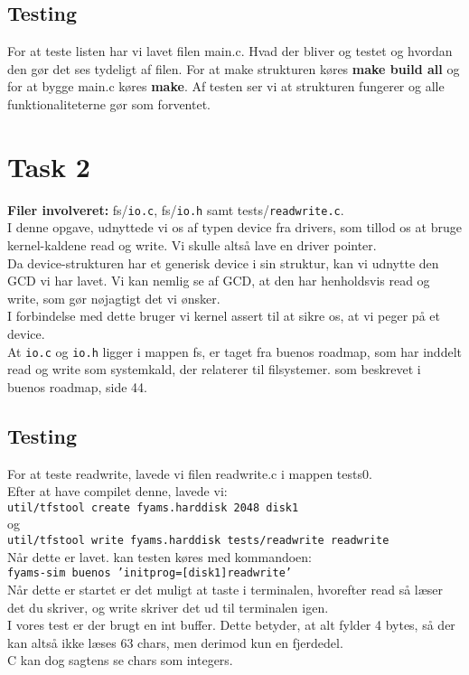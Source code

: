 \documentclass[a4paper,12pt]{article}
\begin{document}
\subsection*{Testing}
For at teste listen har vi lavet filen main.c. Hvad der bliver og testet og hvordan den gør det ses tydeligt af filen. For at make strukturen køres \textbf{make build all} og for at bygge main.c køres \textbf{make}. Af testen ser vi at strukturen fungerer og alle funktionaliteterne gør som forventet.

\section*{Task 2}
\textbf{Filer involveret:} fs/\texttt{io.c}, fs/\texttt{io.h} samt tests/\texttt{readwrite.c}.
\\[5px]
I denne opgave, udnyttede vi os af typen device fra drivers, som tillod os at bruge kernel-kaldene read og write. Vi skulle altså lave en driver pointer. 
\\
Da device-strukturen har et generisk device i sin struktur, kan vi udnytte den GCD vi har lavet. Vi kan nemlig se af GCD, at den har henholdsvis read og write, som gør nøjagtigt det vi ønsker. 
\\
I forbindelse med dette bruger vi kernel assert til at sikre os, at vi peger på et device.
\\
At \texttt{io.c} og \texttt{io.h} ligger i mappen fs, er taget fra buenos roadmap, som har inddelt read og write som systemkald, der relaterer til filsystemer. som beskrevet i buenos roadmap, side 44. 
\\
\subsection*{Testing}
For at teste readwrite, lavede vi filen readwrite.c i mappen tests0.
\\
Efter at have compilet denne, lavede vi:
\\
\texttt{util/tfstool create fyams.harddisk 2048 disk1}
\\
og
\\
\texttt{util/tfstool write fyams.harddisk tests/readwrite readwrite}
\\[5px]
Når dette er lavet. kan testen køres med kommandoen: 
\\
\texttt{fyams-sim buenos 'initprog=[disk1]readwrite'}
\\
Når dette er startet er det muligt at taste i terminalen, hvorefter read så læser det du skriver, og write skriver det ud til terminalen igen. 
\\
I vores test er der brugt en int buffer. Dette betyder, at alt fylder 4 bytes, så der kan altså ikke læses 63 chars, men derimod kun en fjerdedel. 
\\
C kan dog sagtens se chars som integers.
\end{document}
